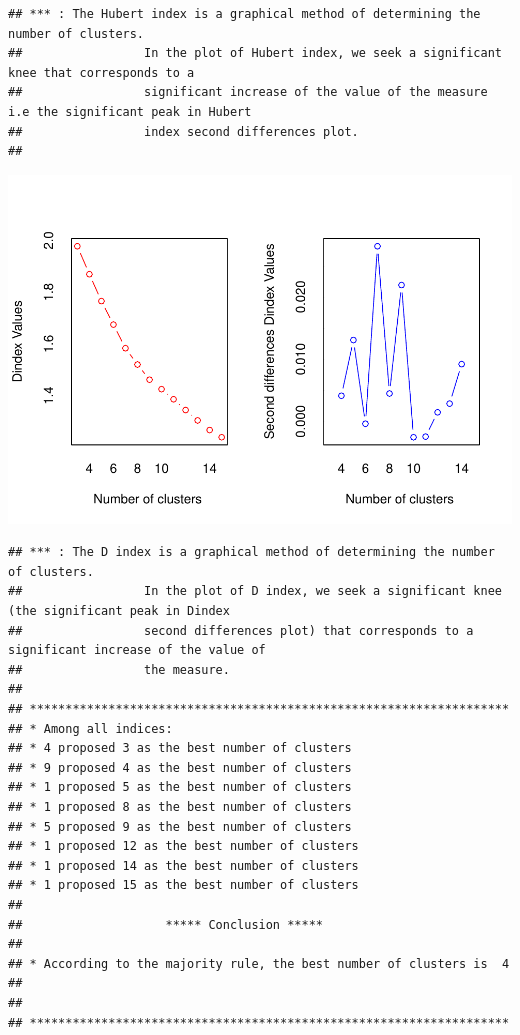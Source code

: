 \documentclass[
]{article}
\begin{document}
\begin{verbatim}
## *** : The Hubert index is a graphical method of determining the number of clusters.
##                 In the plot of Hubert index, we seek a significant knee that corresponds to a 
##                 significant increase of the value of the measure i.e the significant peak in Hubert
##                 index second differences plot. 
## 
\end{verbatim}

\includegraphics{projet_classification_files/figure-latex/unnamed-chunk-19-2.pdf}

\begin{verbatim}
## *** : The D index is a graphical method of determining the number of clusters. 
##                 In the plot of D index, we seek a significant knee (the significant peak in Dindex
##                 second differences plot) that corresponds to a significant increase of the value of
##                 the measure. 
##  
## ******************************************************************* 
## * Among all indices:                                                
## * 4 proposed 3 as the best number of clusters 
## * 9 proposed 4 as the best number of clusters 
## * 1 proposed 5 as the best number of clusters 
## * 1 proposed 8 as the best number of clusters 
## * 5 proposed 9 as the best number of clusters 
## * 1 proposed 12 as the best number of clusters 
## * 1 proposed 14 as the best number of clusters 
## * 1 proposed 15 as the best number of clusters 
## 
##                    ***** Conclusion *****                            
##  
## * According to the majority rule, the best number of clusters is  4 
##  
##  
## *******************************************************************
\end{verbatim}
\end{document}

